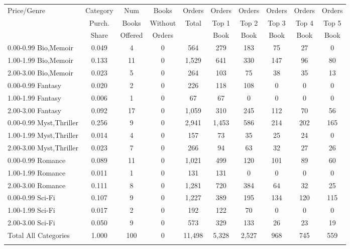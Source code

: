 \begin{center}
\begin{tabular}{lccccccccc}
\hline \noalign{\smallskip}Price/Genre & Category & Num & Books & Orders & Orders & Orders & Orders & Orders & Orders\\
 & Purch. & Books & Without & Total & Top 1 & Top 2 & Top 3 & Top 4 & Top 5\\
 & Share & Offered & Orders &  & Book & Book & Book & Book & Book\\
\noalign{\smallskip}\hline \noalign{\smallskip}0.00-0.99 Bio,Memoir & 0.049 & 4 & 0 & 564 & 279 & 183 & 75 & 27 & 0\\
1.00-1.99 Bio,Memoir & 0.133 & 11 & 0 & 1,529 & 641 & 330 & 147 & 96 & 80\\
2.00-3.00 Bio,Memoir & 0.023 & 5 & 0 & 264 & 103 & 75 & 38 & 35 & 13\\
0.00-0.99 Fantasy & 0.020 & 2 & 0 & 226 & 118 & 108 & 0 & 0 & 0\\
1.00-1.99 Fantasy & 0.006 & 1 & 0 & 67 & 67 & 0 & 0 & 0 & 0\\
2.00-3.00 Fantasy & 0.092 & 17 & 0 & 1,059 & 310 & 245 & 112 & 70 & 56\\
0.00-0.99 Myst,Thriller & 0.256 & 9 & 0 & 2,941 & 1,453 & 586 & 214 & 202 & 165\\
1.00-1.99 Myst,Thriller & 0.014 & 4 & 0 & 157 & 73 & 35 & 25 & 24 & 0\\
2.00-3.00 Myst,Thriller & 0.023 & 7 & 0 & 266 & 94 & 63 & 32 & 27 & 26\\
0.00-0.99 Romance & 0.089 & 11 & 0 & 1,021 & 499 & 120 & 101 & 89 & 60\\
1.00-1.99 Romance & 0.011 & 1 & 0 & 131 & 131 & 0 & 0 & 0 & 0\\
2.00-3.00 Romance & 0.111 & 8 & 0 & 1,281 & 720 & 384 & 64 & 32 & 25\\
0.00-0.99 Sci-Fi & 0.107 & 9 & 0 & 1,227 & 389 & 195 & 134 & 120 & 115\\
1.00-1.99 Sci-Fi & 0.017 & 2 & 0 & 192 & 122 & 70 & 0 & 0 & 0\\
2.00-3.00 Sci-Fi & 0.050 & 9 & 0 & 573 & 329 & 133 & 26 & 23 & 19\\
\hline Total All Categories & 1.000 & 100 & 0 & 11,498 & 5,328 & 2,527 & 968 & 745 & 559\\
\noalign{\smallskip}\hline\end{tabular}\\
\end{center}

